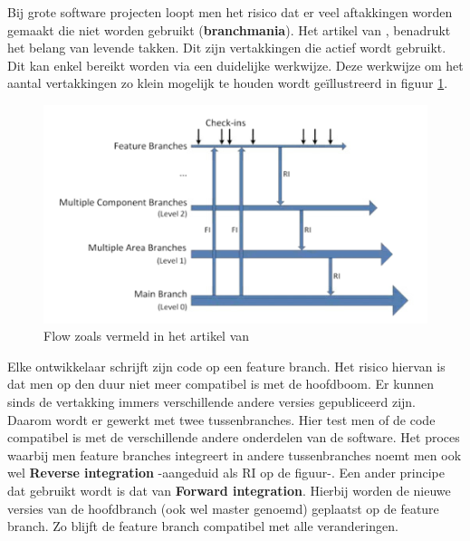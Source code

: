 
Bij grote software projecten loopt men het risico dat er veel aftakkingen worden gemaakt die niet worden gebruikt (\textbf{branchmania}). Het artikel van \textcite{Bird2012}, benadrukt het belang van levende takken. Dit zijn vertakkingen die actief wordt gebruikt. Dit kan enkel bereikt worden via een duidelijke werkwijze. Deze werkwijze om het aantal vertakkingen zo klein mogelijk te houden wordt geïllustreerd in figuur \ref{fig_mic_flow}.

\begin{figure}
\begin{center}
  	\includegraphics[scale=1]{microsoft-branching.png}
\end{center}
\caption[Voorbeeld flow]{Flow zoals vermeld in het artikel van  \textcite{Bird2012}}\label{fig_mic_flow}
\end{figure}

Elke ontwikkelaar schrijft zijn code op een feature branch. Het risico hiervan is dat men op den duur niet meer compatibel is met de hoofdboom. Er kunnen sinds de vertakking immers verschillende andere versies gepubliceerd zijn. Daarom wordt er  gewerkt met twee tussenbranches. Hier test men of de code compatibel is met de verschillende andere onderdelen van de software. Het proces waarbij men feature branches integreert in andere tussenbranches noemt men ook wel \textbf{Reverse integration} -aangeduid als RI op de figuur-. Een ander principe dat gebruikt wordt is dat van \textbf{Forward integration}. Hierbij worden de nieuwe versies van de hoofdbranch (ook wel master genoemd) geplaatst op de feature branch. Zo blijft de feature branch compatibel met alle veranderingen.




